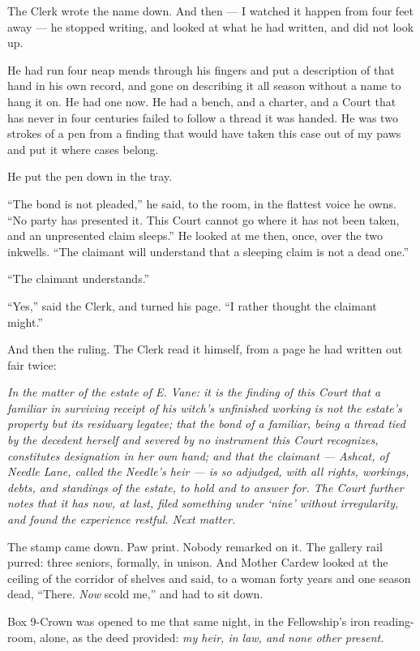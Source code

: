 The Clerk wrote the name down. And then --- I watched it happen from four feet away --- he stopped writing, and looked at what he had written, and did not look up.

He had run four neap mends through his fingers and put a description of that hand in his own record, and gone on describing it all season without a name to hang it on. He had one now. He had a bench, and a charter, and a Court that has never in four centuries failed to follow a thread it was handed. He was two strokes of a pen from a finding that would have taken this case out of my paws and put it where cases belong.

He put the pen down in the tray.

``The bond is not pleaded,'' he said, to the room, in the flattest voice he owns. ``No party has presented it. This Court cannot go where it has not been taken, and an unpresented claim sleeps.'' He looked at me then, once, over the two inkwells. ``The claimant will understand that a sleeping claim is not a dead one.''

``The claimant understands.''

``Yes,'' said the Clerk, and turned his page. ``I rather thought the claimant might.''

And then the ruling. The Clerk read it himself, from a page he had written out fair twice:

\emph{In the matter of the estate of E. Vane: it is the finding of this Court that a familiar in surviving receipt of his witch's unfinished working is not the estate's property but its residuary legatee; that the bond of a familiar, being a thread tied by the decedent herself and severed by no instrument this Court recognizes, constitutes designation in her own hand; and that the claimant --- Ashcat, of Needle Lane, called the Needle's heir --- is so adjudged, with all rights, workings, debts, and standings of the estate, to hold and to answer for. The Court further notes that it has now, at last, filed something under `nine' without irregularity, and found the experience restful. Next matter.}

The stamp came down. Paw print. Nobody remarked on it. The gallery rail purred: three seniors, formally, in unison. And Mother Cardew looked at the ceiling of the corridor of shelves and said, to a woman forty years and one season dead, ``There. \emph{Now} scold me,'' and had to sit down.

\scenebreak

Box 9-Crown was opened to me that same night, in the Fellowship's iron reading-room, alone, as the deed provided: \emph{my heir, in law, and none other present}.

